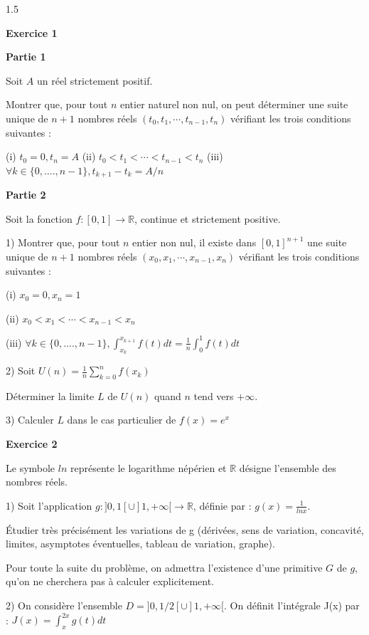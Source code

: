 \documentclass[12pt]{article}
\begin{document}
\begin{spacing}{1.5}

\medskip\textbf{Exercice 1}

\textbf{Partie 1}

Soit $A$ un réel strictement positif. 

Montrer que, pour tout $n$ entier naturel non nul, on peut déterminer une suite unique de $n+1$ 
nombres réels $(t_0, t_1,\cdots, t_{n-1},t_n)$ vérifiant les trois conditions suivantes : 

(i)    $t_0 = 0, t_n = A$ 
(ii)   $t_0 < t_1 < \cdots<t_{n-1} < t_n$
(iii)  $\forall k\in \lbrace 0, ...., n-1\rbrace, t_{k+1}-t_{k}= A/n$

\textbf{Partie 2}

Soit la fonction $f : [0,1]\longrightarrow \mathbb{R}$, continue et strictement positive. 

1) Montrer que, pour tout $n$ entier non nul, il existe dans $[0,1]^{n+1}$ une suite unique de $n+1$ 
nombres réels $(x_0, x_1,\cdots,x_{n-1},  x_n)$ vérifiant les trois conditions suivantes : 

(i)  $x_0 = 0, x_n = 1$

(ii) $x_0 < x_1 < \cdots<x_{n-1} < x_n$

(iii) $\forall k \in \{0, ...., n-1\}, \int_{x_k}^{x_{k+1}}f(t)dt=\frac{1}{n}\int_{0}^{1}f(t)dt$
 
2) Soit $U(n) = \frac{1}{n}\sum_{k=0}^{n}f(x_k)$ 

Déterminer la limite $L$ de $U(n)$ quand $n$ tend vers $+\infty$. 

3) Calculer $L$ dans le cas particulier de $f(x) = e^x$

\medskip\textbf{Exercice 2}

Le symbole $ln$ représente le logarithme népérien et $\mathbb{R}$ désigne l'ensemble des nombres réels. 

1) Soit l'application $g : ]0,1[\cup ]1,+\infty[\longrightarrow \mathbb{R}$, définie par : 
$g(x)=\frac{1}{lnx}$.
 
 Étudier très précisément les variations de g (dérivées, sens de variation, concavité, limites, 
asymptotes éventuelles, tableau de variation, graphe). 

Pour toute la suite du problème, on admettra l'existence d'une primitive $G$ de $g$, qu'on ne 
cherchera pas à calculer explicitement. 
 
2) On considère l'ensemble $D = ]0,1/2[\cup ]1,+\infty[$. 
On définit l'intégrale J(x) par : 
$J(x) =\int_{x}^{2x}g(t)dt$


\end{spacing}
\end{document}
